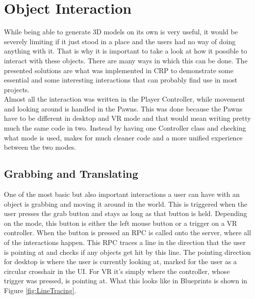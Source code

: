 

\section{Object Interaction}\label{chp:ObjectInteraction}
While being able to generate 3D models on its own is very useful, it would be severely limiting if it just stood in a place and the users had no way of doing anything with it. That is why it is important to take a look at how it possible to interact with these objects. There are many ways in which this can be done. The presented solutions are what was implemented in \acs{CRP} to demonstrate some essential and some interesting interactions that can probably find use in most projects.\\
Almost all the interaction was written in the Player Controller, while movement and looking around is handled in the Pawns. This was done because the Pawns have to be different in desktop and VR mode and that would mean writing pretty much the same code in two. Instead by having one Controller class and checking what mode is used, makes for much cleaner code and a more unified experience between the two modes.
\subsection{Grabbing and Translating}

One of the most basic but also important interactions a user can have with an object is grabbing and moving it around in the world. This is triggered when the user presses the grab button and stays as long as that button is held. Depending on the mode, this button is either the left mouse button or a trigger on a \acs{VR} controller. When the button is pressed an \acs{RPC} is called onto the server, where all of the interactions happen. This \acs{RPC} traces a line in the direction that the user is pointing at and checks if any objects get hit by this line. The pointing direction for desktop is where the user is currently looking at, marked for the user as a circular crosshair in the UI. For VR it's simply where the controller, whose trigger was pressed, is pointing at. What this looks like in Blueprints is shown in Figure \ref{fig:LineTracing}.

